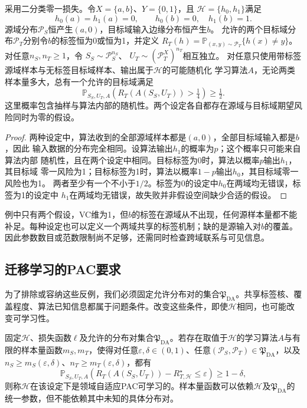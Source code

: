\begin{theorem}[缺少覆盖时的不可学习性]
\label{thm:transfer-nonidentifiability}
采用二分类零一损失。令$X=\{a,b\}$、$Y=\{0,1\}$，且
$\mathcal H=\{h_0,h_1\}$满足
\[
 h_0(a)=h_1(a)=0,\qquad h_0(b)=0,\quad h_1(b)=1.
\]
源域分布$\mathcal P_S$恒产生$(a,0)$，目标域输入边缘分布恒产生$b$。
允许的两个目标域分布$\mathcal P_T$分别令$b$的标签恒为0或恒为1，并定义
$R_T(h)=\mathbb P_{(x,y)\sim\mathcal P_T}\{h(x)\neq y\}$。
对任意$n_S,n_T\geq1$，令
$S_S\sim\mathcal P_S^{n_S}$、
$U_T\sim(\mathcal P_T^X)^{n_T}$相互独立。
对任意只使用带标签源域样本与无标签目标域样本、输出属于$\mathcal H$的可能随机化
学习算法$A$，无论两类样本量多大，总有一个允许的目标域满足
\[
 \mathbb P_{S_S,U_T,A}\!\left(
 R_T(A(S_S,U_T))>\tfrac14
 \right)\geq\tfrac12.
\]
这里概率包含抽样与算法内部的随机性。两个设定各自都存在源域与目标域期望风险同时为零的假设。
\end{theorem}
\begin{proof}
两种设定中，算法收到的全部源域样本都是$(a,0)$，全部目标域输入都是$b$，因此
输入数据的分布完全相同。设算法输出$h_1$的概率为$p$；这个概率只可能来自算法内部
随机性，且在两个设定中相同。目标标签为0时，算法以概率$p$输出$h_1$，其目标域
零一风险为1；目标标签为1时，算法以概率$1-p$输出$h_0$，其目标域零一风险也为1。
两者至少有一个不小于$1/2$。标签为0的设定中$h_0$在两域均无错误，标签为1的设定中
$h_1$在两域均无错误，故失败并非假设空间缺少合适的假设。
\end{proof}

例中只有两个假设，VC维为1，但$b$的标签在源域从不出现，任何源样本量都不能补足。每种设定也可以定义一个两域共享的标签机制；缺的是源输入对$b$的覆盖。因此参数数目或范数限制尚不足够，还需同时检查跨域联系与可见信息。

\subsection{迁移学习的PAC要求}
\label{sec:transfer-pac-setting}

为了排除或容纳这些反例，我们必须固定允许分布对的集合$\mathfrak P_{\mathrm{DA}}$。共享标签核、覆盖程度、算法已知信息都属于问题条件。改变这些条件，即使$\mathcal H$相同，也可能改变可学习性。

\begin{definition}[相对于分布族的领域自适应PAC可学习性]
\label{def:adaptation-pac-learnability}
固定$\mathcal H$、损失函数$\ell$及允许的分布对集合$\mathfrak P_{\mathrm{DA}}$。若存在取值于$\mathcal H$的学习算法$A$与有限的样本量函数$m_S,m_T$，使得对任意$\varepsilon,\delta\in(0,1)$、任意$(\mathcal P_S,\mathcal P_T)\in\mathfrak P_{\mathrm{DA}}$，以及$n_S\geq m_S(\varepsilon,\delta)$、$n_T\geq m_T(\varepsilon,\delta)$，都有
\[
 \mathbb P_{S_S,U_T,A}\!\left(
 R_T(A(S_S,U_T))-R_{T,\mathcal H}^{\star}\leq\varepsilon
 \right)\geq1-\delta,
\]
则称$\mathcal H$在该设定下是领域自适应PAC可学习的。样本量函数可以依赖$\mathcal H$及$\mathfrak P_{\mathrm{DA}}$的统一参数，但不能依赖其中未知的具体分布对。
\end{definition}

